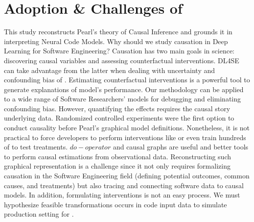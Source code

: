 \section{Adoption \& Challenges of \codegen}
\label{sec:discussion-conditioned}

This study reconstructs Pearl's theory of Causal Inference and grounds it in interpreting Neural Code Models. Why should we study causation in Deep Learning for Software Engineering? Causation has two main goals in science: discovering causal variables and assessing counterfactual interventions. DL4SE can take advantage from the latter when dealing with uncertainty and confounding bias of \nlms. Estimating counterfactual interventions is a powerful tool to generate explanations of model's performance. Our methodology \codegen can be applied to a wide range of Software Researchers' models for debugging and eliminating confounding bias. However, quantifying the effects requires the causal story underlying data. Randomized controlled experiments were the first option to conduct causality before Pearl's graphical model definitions. Nonetheless, it is not practical to force developers to perform interventions like \datainterII or even train hundreds of \nlms to test treatments. $do-operator$ and causal graphs are useful and better tools to perform causal estimations from observational data. Reconstructing such graphical representation is a challenge since it not only requires formalizing causation in the Software Engineering field (\ie defining potential outcomes, common causes, and treatments) but also tracing and connecting software data to causal models. In addition, formulating interventions is not an easy process. We must hypothesize feasible transformations occurs in code input data to simulate production setting for \nlms. 


